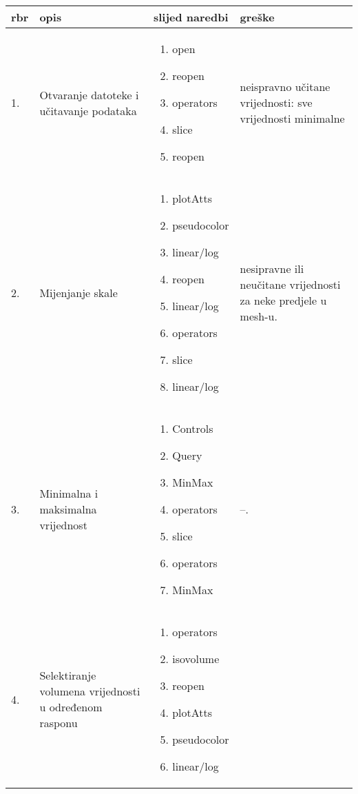 \documentclass[times, utf8, zavrsni]{fer}
\begin{document}
	\begin{longtable}{|l|p{80pt}|p{100pt}|p{120pt}|}
\hline
rbr & opis & slijed naredbi & greške\\
\hline
\endhead %
1. & Otvaranje datoteke i učitavanje podataka &
\begin{enumerate}
    \item open
    \item reopen
    \item operators
    \item slice
    \item reopen
\end{enumerate}
& neispravno učitane vrijednosti: sve vrijednosti minimalne\\
\hline
2. & Mijenjanje skale & \begin{enumerate}
    \item plotAtts
    \item pseudocolor
    \item linear/log
    \item reopen
    \item linear/log
    \item operators
    \item slice
    \item linear/log
\end{enumerate}
& nesipravne ili neučitane vrijednosti za neke predjele u mesh-u.\\
\hline
3. & Minimalna i maksimalna vrijednost & \begin{enumerate}
    \item Controls
    \item Query
    \item MinMax
    \item operators
    \item slice
    \item operators
    \item MinMax
\end{enumerate}
& --.\\
\hline
4. & Selektiranje volumena vrijednosti u određenom rasponu & \begin{enumerate}
    \item operators
    \item isovolume
    \item reopen
    \item plotAtts
    \item pseudocolor
    \item linear/log

\end{enumerate}
\end{longtable}
\end{document}
